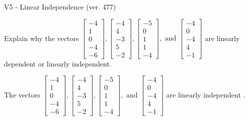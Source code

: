 \begin{exercise}
  \begin{exerciseTitle}V5 - Linear Independence (ver. 477)\end{exerciseTitle}
  \begin{exerciseStatement}
    Explain why the vectors \(\left[\begin{array}{r}
-4 \\
1 \\
0 \\
-4 \\
-6
\end{array}\right] , \left[\begin{array}{r}
-4 \\
4 \\
-3 \\
5 \\
-2
\end{array}\right] , \left[\begin{array}{r}
-5 \\
0 \\
1 \\
1 \\
-4
\end{array}\right] , \text{ and } \left[\begin{array}{r}
-4 \\
0 \\
-4 \\
4 \\
-1
\end{array}\right]\) are linearly dependent or linearly independent.	


  \end{exerciseStatement}
  \begin{exerciseAnswer}
   The vectors \(\left[\begin{array}{r}
-4 \\
1 \\
0 \\
-4 \\
-6
\end{array}\right] , \left[\begin{array}{r}
-4 \\
4 \\
-3 \\
5 \\
-2
\end{array}\right] , \left[\begin{array}{r}
-5 \\
0 \\
1 \\
1 \\
-4
\end{array}\right] , \text{ and } \left[\begin{array}{r}
-4 \\
0 \\
-4 \\
4 \\
-1
\end{array}\right]\) are 
  	 linearly independent  .
  


  \end{exerciseAnswer}
\end{exercise}